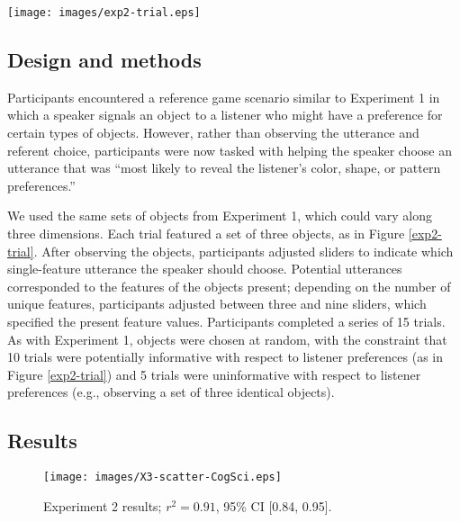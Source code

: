 \documentclass[10pt,a4paper]{article}
\begin{document}
\begin{figure*}[ht]
	\centering
	\texttt{[image: images/exp2-trial.eps]}
	\caption{A sample trial from \emph{Experiment 2: Choosing utterances}.}\label{exp2-trial}
\end{figure*}


\subsection{Design and methods}

Participants encountered a reference game scenario similar to Experiment 1 in which a speaker signals an object to a listener who might have a preference for certain types of objects. However, rather than observing the utterance and referent choice, participants were now tasked with helping the speaker choose an utterance that was ``most likely to reveal the listener's color, shape, or pattern preferences.''

We used the same sets of objects from Experiment 1, which could vary along three dimensions. Each trial featured a set of three objects, as in Figure \ref{exp2-trial}. After observing the objects, participants adjusted sliders to indicate which single-feature utterance the speaker should choose. Potential utterances corresponded to the features of the objects present; depending on the number of unique features, participants adjusted between three and nine sliders, which specified the present feature values. Participants completed a series of 15 trials. As with Experiment 1, objects were chosen at random, with the constraint that 10 trials were potentially informative with respect to listener preferences (as in Figure \ref{exp2-trial}) and 5 trials were uninformative with respect to listener preferences (e.g., observing a set of three identical objects). 

\subsection{Results}

\begin{figure}[ht]
	\centering
	\texttt{[image: images/X3-scatter-CogSci.eps]}
	\caption{Experiment 2 results; $r^{2}=0.91$, 95\% CI [0.84, 0.95].}\label{exp2-results}
\end{figure}



\end{document}
